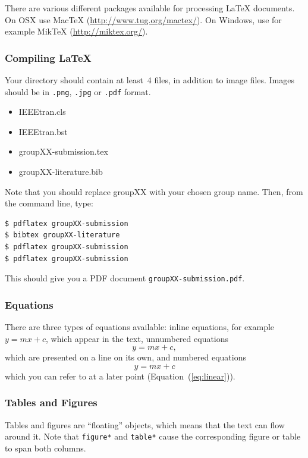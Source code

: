 \documentclass[10pt,conference,compsocconf]{IEEEtran}
\begin{document}
There are various different packages available for processing \LaTeX{}
documents.
On OSX use Mac\TeX{}
(\url{http://www.tug.org/mactex/}). On Windows, use for example Mik\TeX{} (\url{http://miktex.org/}).

\subsubsection{Compiling \LaTeX{}}
Your directory should contain at least~4 files, in addition to image
files. Images should be in \texttt{.png}, \texttt{.jpg} or
\texttt{.pdf} format.
\begin{itemize}
\item IEEEtran.cls
\item IEEEtran.bst
\item groupXX-submission.tex
\item groupXX-literature.bib
\end{itemize}
Note that you should replace groupXX with your chosen group name.
Then, from the command line, type:
\begin{verbatim}
$ pdflatex groupXX-submission
$ bibtex groupXX-literature
$ pdflatex groupXX-submission
$ pdflatex groupXX-submission
\end{verbatim}
This should give you a PDF document \texttt{groupXX-submission.pdf}.

\subsubsection{Equations}

There are three types of equations available: inline equations, for
example $y=mx + c$, which appear in the text, unnumbered equations
$$y=mx + c,$$
which are presented on a line on its own, and numbered equations
\begin{equation}
  \label{eq:linear}
  y = mx + c
\end{equation}
which you can refer to at a later point (Equation~(\ref{eq:linear})).

\subsubsection{Tables and Figures}

Tables and figures are ``floating'' objects, which means that the text
can flow around it.
Note
that \texttt{figure*} and \texttt{table*} cause the corresponding
figure or table to span both columns.
\end{document}
